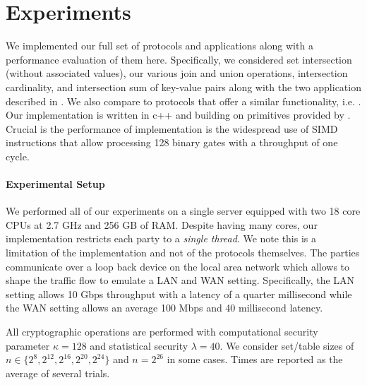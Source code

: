 

\section{Experiments}\label{sec:eval}


We implemented our full set of protocols and applications along with a performance evaluation of them here. Specifically, we considered set intersection (without associated values), our various join and union operations, intersection cardinality, and intersection sum of key-value pairs along with the two application described in . We also compare to protocols that offer a similar functionality, i.e. \cite{CCS:KKRT16, PSWW18,ASIACCS:BlaAgu12,DBLP:conf/cans/CristofaroGT12,cryptoeprint:2017:738}. Our implementation is written in c++ and building on primitives provided by \cite{libOTe}. Crucial is the performance of implementation is the widespread use of SIMD instructions that allow processing 128 binary gates with a throughput of one cycle.



\paragraph{Experimental Setup} We performed all of our experiments on a single server equipped with two 18 core CPUs at 2.7 GHz and 256 GB of RAM. Despite having many cores, our implementation restricts each party to a \emph{single thread}. We note this is a limitation of the implementation and not of the protocols themselves. The parties communicate over a loop back device on the local area network which allows to shape the traffic flow to emulate a LAN and WAN setting. Specifically, the LAN setting allows 10 Gbps throughput with a latency of a quarter millisecond while the WAN setting allows an average 100 Mbps and 40 millisecond latency.

All cryptographic operations are performed with computational security parameter $\kappa=128$ and statistical security $\lambda=40$. We consider set/table sizes of $n\in\{2^8, 2^{12}, 2^{16}, 2^{20}, 2^{24}\}$ and $n=2^{26}$ in some cases. Times are reported as the average of several trials.

